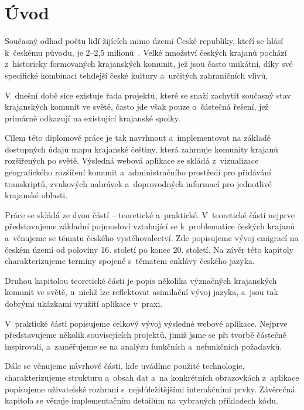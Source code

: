 \hypertarget{uxfavod}{%
\chapter*{Úvod}\label{uvod}}

Současný odhad počtu lidí žijících mimo území České republiky, kteří se hlásí k~českému původu, je 2--2,5 milionů~\parencite{Krajane-mv2}. Velké množství českých krajanů pochází z~historicky formovaných krajanských komunit, jež jsou často unikátní, díky své specifické kombinaci tehdejší české kultury a~určitých zahraničních vlivů.

V~dnešní době sice existuje řada projektů, které se snaží zachytit současný stav krajanských komunit ve světě, často jde však pouze o~částečná řešení, jež primárně odkazují na existující krajanské spolky.

Cílem této diplomové práce je tak navrhnout a~implementovat na základě dostupných údajů mapu krajanské češtiny, která zahrnuje komunity krajanů rozšířených po světě. Výsledná webová aplikace se skládá z~vizualizace geografického rozšíření komunit a~administračního prostředí pro přidávání transkriptů, zvukových nahrávek a~doprovodných informací pro jednotlivé krajanské oblasti.

Práce se skládá ze dvou částí -- teoretické a~praktické. V~teoretické části nejprve představujeme základní pojmosloví vztahující se k~problematice českých krajanů a~věnujeme se tématu českého vystěhovalectví. Zde popisujeme vývoj emigrací na českém území od poloviny 16. století po konec 20. století. Na závěr této kapitoly charakterizujeme termíny spojené s~tématem enklávy českého jazyka.

Druhou kapitolou teoretické části je popis několika význačných krajanských komunit ve světě, u~nichž lze reflektovat asimilační vývoj jazyka, a~jsou tak dobrými ukázkami využití aplikace v~praxi.

V~praktické části popisujeme celkový vývoj výsledné webové aplikace. Nejprve představujeme několik souvisejících projektů, jimiž jsme se při tvorbě částečně inspirovali, a~zaměřujeme se na analýzu funkčních a~nefunkčních požadavků.

Dále se věnujeme návrhové části, kde uvádíme použité technologie, charakterizujeme strukturu a~obsah dat a~na konkrétních obrazovkách z~aplikace popisujeme uživatelské rozhraní s~nejdůležitějšími interakčními prvky. Závěrečná kapitola se věnuje implementačním detailům na vybraných příkladech kódu.
